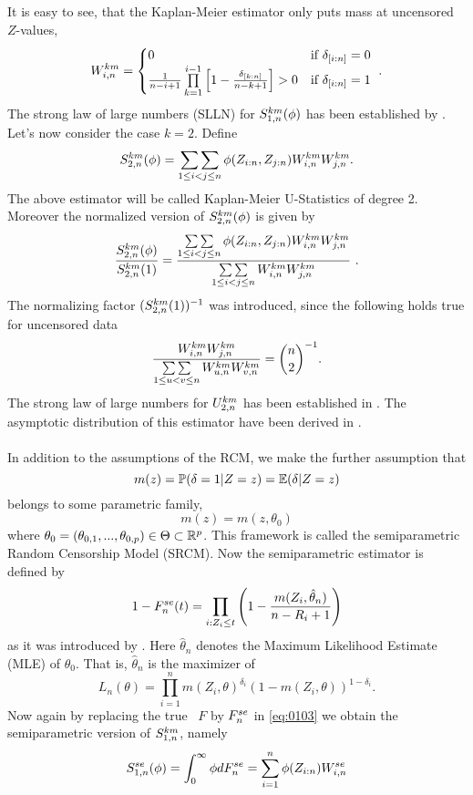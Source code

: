 It is easy to see, that the Kaplan-Meier estimator only puts mass at uncensored $Z$-values, \ie 
\[ W_{i,n}^{km} = \begin{cases} 
0 & \textrm{if } \delta_{[i:n]} = 0 \\
\frac{1}{n-i+1}\prod\limits_{k=1}^{i-1}\left[1-\frac{\delta_{[k:n]}}{n-k+1}\right] > 0 & \textrm{if } \delta_{[i:n]} = 1
\end{cases}\textrm{ .}
\]
%
The strong law of large numbers (SLLN) for $S_{1,n}^{km}(\phi)$ has been established by \citet{stute1993strong}.
%
Let's now consider the case $k=2$. Define
\begin{equation*}
S_{2,n}^{km}(\phi) = \mathop{\sum\sum}\limits_{1\leq i < j \leq n} \phi(Z_{i:n}, Z_{j:n}) W_{i,n}^{km} W_{j,n}^{km}.
\end{equation*}
The above estimator will be called Kaplan-Meier U-Statistics of degree 2. Moreover the normalized version of $S_{2,n}^{km}(\phi)$ is given by
$$\frac{S_{2,n}^{km}(\phi)}{S_{2,n}^{km}(1)} = \frac{\mathop{\sum\sum}\limits_{1\leq i < j \leq n} \phi(Z_{i:n}, Z_{j:n}) W_{i,n}^{km} W_{j,n}^{km}}{\mathop{\sum\sum}\limits_{1\leq i < j \leq n} W_{i,n}^{km} W_{j,n}^{km}}\textrm{ .}$$  
The normalizing factor $(S_{2,n}^{km}(1))^{-1}$ was introduced, since the following holds true for uncensored data
$$\frac{W_{i,n}^{km}W_{j,n}^{km}}{\mathop{\sum\sum}\limits_{1\leq u < v \leq n}W_{u,n}^{km}W_{v,n}^{km}} = \binom{n}{2}^{-1}\textrm{.}$$
The strong law of large numbers for $U_{2,n}^{km}$ has been established in \citet{bose1999strong}.
The asymptotic distribution of this estimator have been derived in \citet{bose2002asymptotic}. \\
\\
In addition to the assumptions of the RCM, we make the further assumption that 
$$m(z) = \mathbb{P}(\delta=1|Z=z) = \mathbb{E}(\delta|Z=z)$$
belongs to some parametric family, \ie\
$$m(z) = m(z,\theta_0)$$
where $\theta_0=(\theta_{0,1},...,\theta_{0,p})\in \Theta \subset \mathbb{R}^p$. This framework is called the semiparametric Random Censorship Model (SRCM).
%
Now the semiparametric estimator is defined by
$$1-F_n^{se}(t) = \prod\limits_{i:Z_i\leq t}\left(1-\frac{m(Z_i,\hat{\theta}_n)}{n-R_i+1}\right)$$
as it was introduced by \citet{dikta2000strong}. Here $\hat{\theta}_n$ denotes the Maximum Likelihood Estimate (MLE) of $\theta_0$. That is, $\hat{\theta}_n$ is the maximizer of 
$$L_n(\theta)=\prod\limits_{i=1}^{n} m(Z_i,\theta)^{\delta_i}(1-m(Z_i,\theta))^{1-\delta_i}.$$
Now again by replacing the true \df\ $F$ by $F_n^{se}$ in \eqref{eq:0103} we obtain the semiparametric version of $S_{1,n}^{km}$, namely
$$S_{1,n}^{se}(\phi)=\int_0^\infty \phi dF_n^{se} = \sum\limits_{i=1}^n \phi(Z_{i:n})W_{i,n}^{se}$$
